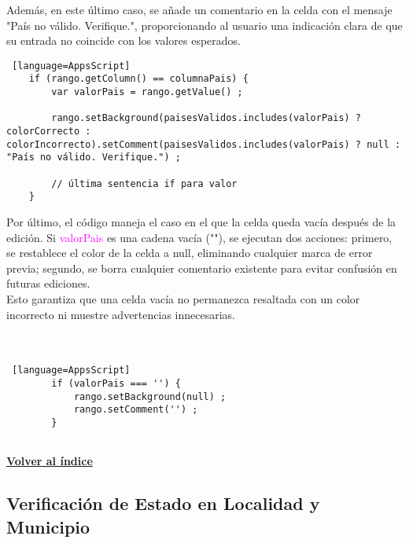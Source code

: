 \documentclass[12pt]{article} %
\begin{document}
    Además, en este último caso, se añade un comentario en la celda con el mensaje "País no válido. Verifique.", proporcionando al usuario una indicación clara de que su entrada no coincide con los valores esperados.

    \begin{lstlisting} [language=AppsScript]
    if (rango.getColumn() == columnaPais) {
        var valorPais = rango.getValue() ;
    
        rango.setBackground(paisesValidos.includes(valorPais) ? colorCorrecto : colorIncorrecto).setComment(paisesValidos.includes(valorPais) ? null : "País no válido. Verifique.") ;

        // última sentencia if para valor
    }
    \end{lstlisting}
    
    Por último, el código maneja el caso en el que la celda queda vacía después de la edición. Si \textcolor{magenta}{valorPais} es una cadena vacía (""), se ejecutan dos acciones: primero, se restablece el color de la celda a null, eliminando cualquier marca de error previa; segundo, se borra cualquier comentario existente para evitar confusión en futuras ediciones. \\
    
    Esto garantiza que una celda vacía no permanezca resaltada con un color incorrecto ni muestre advertencias innecesarias. \\ \\ \\

    \begin{lstlisting} [language=AppsScript]
        if (valorPais === '') {
            rango.setBackground(null) ; 
            rango.setComment('') ;
        }
    
    \end{lstlisting}





            \begin{flushright}
                \hyperlink{toc}{\textbf{Volver al índice}}
            \end{flushright}


    

    \subsection*{Verificación de Estado en Localidad y Municipio}
    \\
\end{document}
